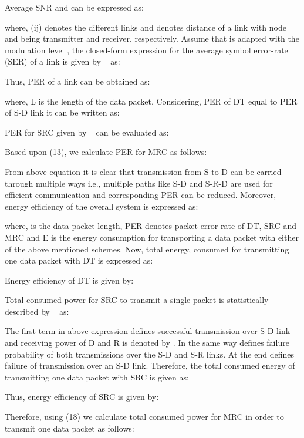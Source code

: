 \documentclass{sig-alternate}
\begin{document}
Average SNR  and can be expressed as:


where, (ij) denotes the different links and  denotes distance of a link with node  and  being transmitter and receiver, respectively.
Assume that  is adapted with the modulation level , the closed-form expression for the average symbol error-rate (SER) of a link is given by ~\cite{6} as:
 

Thus, PER of a link can be obtained as:
 

where, L is the length of the data packet. Considering, PER of DT equal to PER of S-D link it can be written as:
  

PER for SRC given by ~\cite{6} can be evaluated as:
  \small
  
\normalsize

Based upon (13), we calculate PER for MRC as follows:
\small
 
\normalsize

From above equation it is clear that transmission from S to D can be carried through multiple ways i.e., multiple paths like S-D and S-R-D are used for efficient communication and corresponding PER can be reduced. Moreover, energy efficiency of the overall system is expressed as:
 

where,  is the data packet length, PER denotes packet error rate of DT, SRC and MRC and E is the energy consumption for transporting a data packet with either of the above mentioned schemes.
Now, total energy, consumed for transmitting one data packet with DT is expressed as:
 

Energy efficiency of DT is given by:
 

Total consumed power for SRC to transmit a single packet is statistically described by ~\cite{6} as:
\small

\normalsize

The first term in above expression  defines successful transmission over S-D link and  receiving power of D and R is denoted by . In the same way  defines failure probability of both transmissions over the S-D and S-R links. At the end  defines failure of transmission over an S-D link.
Therefore, the total consumed energy of transmitting one data packet with SRC is given as:


\normalsize

Thus, energy efficiency of SRC is given by:

Therefore, using (18) we calculate total consumed power for MRC in order to transmit one data packet as follows:
\tiny
\end{document}
